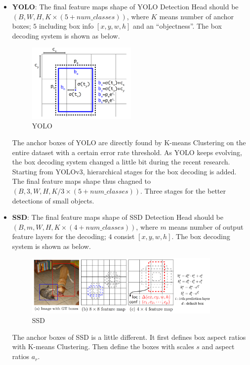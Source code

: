 \documentclass[a4paper]{article}
\begin{document}
\begin{itemize}
	\item \textbf{YOLO}: The final feature maps shape of YOLO Detection Head should be $(B, W, H, K \times (5 + num\_classes))$, where $K$ means number of anchor boxes; $5$ including box info $[x, y, w, h]$ and an ``objectness''. The box decoding system is shown as below.
	\begin{figure}[h]
		\centering
		\includegraphics[width=0.5\textwidth]{images/YOLO.png}
		\caption{YOLO}
		\label{fig:yolo}
	\end{figure}
	The anchor boxes of YOLO are directly found by K-means Clustering on the entire dataset with a certain error rate threshold. As YOLO keeps evolving, the box decoding system changed a little bit during the recent research. Starting from YOLOv3, hierarchical stages for the box decoding is added. The final feature maps shape thus chagned to $(B, 3, W, H, K/3 \times (5 + num\_classes))$. Three stages for the better detections of small objects.
	\item \textbf{SSD}: The final feature maps shape of SSD Detection Head should be $(B, m, W, H, K \times (4 + num\_classes))$, where $m$ means number of output feature layers for the decoding; $4$ consist $[x, y, w, h]$. The box decoding system is shown as below.
	\begin{figure}[h]
		\centering
		\includegraphics[width=0.9\textwidth]{images/SSD.png}
		\caption{SSD}
		\label{fig:ssd}
	\end{figure}
	The anchor boxes of SSD is a little different. It first defines box aspect ratios with K-means Clustering. Then define the boxes with scales $s$ and aspect ratios $a_r$. 

\end{itemize}
\end{document}
